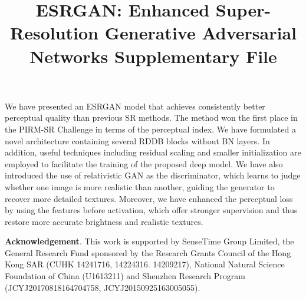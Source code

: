 \documentclass[runningheads]{llncs}
\begin{document}
We have presented an ESRGAN model that achieves consistently better perceptual quality than previous SR 
methods. The method won the first place in the PIRM-SR Challenge in terms of the perceptual index. 
%
We have formulated a novel architecture containing several RDDB blocks without BN layers. In addition, useful 
techniques including residual scaling and smaller initialization are employed to facilitate the training of the 
proposed deep model.
%
We have also introduced the use of relativistic GAN as the discriminator, which learns to judge whether one image is 
more realistic  
than another, guiding the generator to recover more detailed textures.
%
Moreover, we have enhanced the perceptual loss by using the features before activation, which offer stronger 
supervision 
and thus restore more accurate brightness and realistic textures.



\vspace{0.5cm}
\noindent\textbf{Acknowledgement}.
This work is supported by SenseTime Group Limited, the General Research Fund sponsored by the Research Grants 
Council of the Hong Kong SAR (CUHK 14241716, 14224316. 14209217), National Natural Science Foundation of China 
(U1613211) and Shenzhen Research Program \\ (JCYJ20170818164704758, JCYJ20150925163005055).


{\scriptsize 


}


\pagestyle{headings}

\title{ESRGAN: Enhanced Super-Resolution Generative Adversarial Networks Supplementary File\vspace{-0.3cm}}

\end{document}
